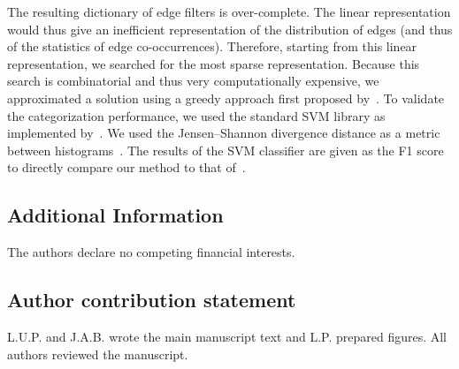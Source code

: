 \documentclass{article}%
\begin{document}
The resulting dictionary of edge filters is over-complete. 
The linear representation would thus give an inefficient representation 
of the distribution of edges (and thus of the statistics of edge co-occurrences).
Therefore, starting from this linear representation, 
we searched for the most sparse representation.
Because this search is combinatorial and thus very computationally
expensive, we approximated a solution using a greedy approach first
proposed by~\citet{Perrinet02sparse}.
%
To validate the categorization performance, 
we used the standard SVM library as implemented by~\citet{Pedregosa11}. 
We used the Jensen--Shannon divergence distance
as a metric between histograms~\citep{Cha02}. %
The results of the SVM classifier are given as the F1 score
to directly compare our method to that of~\citet{Serre07}.
%


\subsection*{Additional Information}  %
The authors declare no competing financial interests.

\noindent\Acknowledgments %
\subsection*{Author contribution statement}  %
L.U.P. and J.A.B. wrote the main manuscript text and L.P. prepared figures. All authors reviewed the manuscript. 

\end{document}
